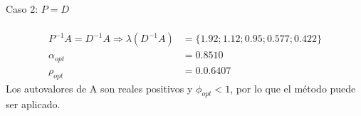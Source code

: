 \begin{itemize}
Caso 2: $P = D$\\\\
\begin{align}
    P^{-1}A = D^{-1}A \Rightarrow \lambda(D^{-1}A) &= \{1.92;1.12;0.95;0.577;0.422\} \\
    \alpha_{opt} &= 0.8510 \\
    \rho_{opt} &= 0.0.6407
\end{align}
Los autovalores de A son reales positivos y $\phi_{opt} < 1$, por lo que el método puede ser aplicado.

\end{itemize}